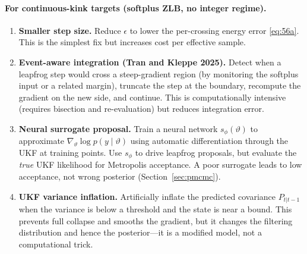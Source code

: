 \documentclass[11pt]{article}
\begin{document}
\paragraph{For continuous-kink targets (softplus ZLB, no integer regime).}
\begin{enumerate}
\item \textbf{Smaller step size.} Reduce $\epsilon$ to lower the per-crossing
      energy error \eqref{eq:56a}. This is the simplest fix but increases
      cost per effective sample.
\item \textbf{Event-aware integration (Tran and Kleppe 2025).} Detect when a
      leapfrog step would cross a steep-gradient region (by monitoring the
      softplus input or a related margin), truncate the step at the boundary,
      recompute the gradient on the new side, and continue. This is
      computationally intensive (requires bisection and re-evaluation) but
      reduces integration error.
\item \textbf{Neural surrogate proposal.} Train a neural network
      $s_\phi(\vartheta)$ to approximate $\nabla_\vartheta\log p(y\mid\vartheta)$
      using automatic differentiation through the UKF at training points. Use
      $s_\phi$ to drive leapfrog proposals, but evaluate the \emph{true} UKF
      likelihood for Metropolis acceptance. A poor surrogate leads to low
      acceptance, not wrong posterior (Section~\ref{sec:pmcmc}).
\item \textbf{UKF variance inflation.} Artificially inflate the predicted
      covariance $P_{t|t-1}$ when the variance is below a threshold and the
      state is near a bound. This prevents full collapse and smooths the
      gradient, but it changes the filtering distribution and hence the
      posterior—it is a modified model, not a computational trick.
\end{enumerate}
\end{document}
